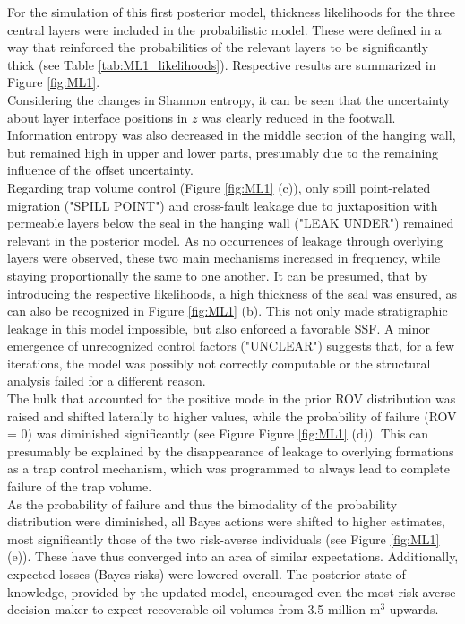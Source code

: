 		For the simulation of this first posterior model, thickness likelihoods for the three central layers were included in the probabilistic model. These were defined in a way that reinforced the probabilities of the relevant layers to be significantly thick (see Table \ref{tab:ML1_likelihoods}). Respective results are summarized in Figure \ref{fig:ML1}.\\
		Considering the changes in Shannon entropy, it can be seen that the uncertainty about layer interface positions in $z$ was clearly reduced in the footwall. Information entropy was also decreased in the middle section of the hanging wall, but remained high in upper and lower parts, presumably due to the remaining influence of the offset uncertainty.\\
		Regarding trap volume control (Figure \ref{fig:ML1} (c)), only spill point-related migration ("SPILL POINT") and cross-fault leakage due to juxtaposition with permeable layers below the seal in the hanging wall ("LEAK UNDER") remained relevant in the posterior model. As no occurrences of leakage through overlying layers were observed, these two main mechanisms increased in frequency, while staying proportionally the same to one another. It can be presumed, that by introducing the respective likelihoods, a high thickness of the seal was ensured, as can also be recognized in Figure \ref{fig:ML1} (b). This not only made stratigraphic leakage in this model impossible, but also enforced a favorable SSF. A minor emergence of unrecognized control factors ("UNCLEAR") suggests that, for a few iterations, the model was possibly not correctly computable or the structural analysis failed for a different reason.\\
		The bulk that accounted for the positive mode in the prior ROV distribution was raised and shifted laterally to higher values, while the probability of failure (ROV = 0) was diminished significantly (see Figure Figure \ref{fig:ML1} (d)). This can presumably be explained by the disappearance of leakage to overlying formations as a trap control mechanism, which was programmed to always lead to complete failure of the trap volume.\\
		As the probability of failure and thus the bimodality of the probability distribution were diminished, all Bayes actions were shifted to higher estimates, most significantly those of the two risk-averse individuals (see Figure \ref{fig:ML1} (e)). These have thus converged into an area of similar expectations. Additionally, expected losses (Bayes risks) were lowered overall. The posterior state of knowledge, provided by the updated model, encouraged even the most risk-averse decision-maker to expect recoverable oil volumes from 3.5 million m$^3$ upwards.
		
